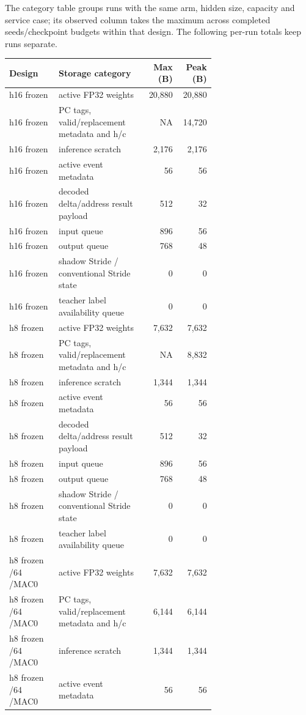 \documentclass[10pt]{article}
\begin{document}
The category table groups runs with the same arm, hidden size, capacity and service case; its observed column takes the maximum across completed seeds/checkpoint budgets within that design. The following per-run totals keep runs separate.

\begin{center}
\scriptsize
\begin{longtable}{p{0.24\linewidth}p{0.43\linewidth}rr}
\toprule
Design & Storage category & Max (B) & Peak (B) \\
\midrule
\endhead
h16 frozen & active FP32 weights & 20,880 & 20,880 \\
h16 frozen & PC tags, valid/replacement metadata and h/c & NA & 14,720 \\
h16 frozen & inference scratch & 2,176 & 2,176 \\
h16 frozen & active event metadata & 56 & 56 \\
h16 frozen & decoded delta/address result payload & 512 & 32 \\
h16 frozen & input queue & 896 & 56 \\
h16 frozen & output queue & 768 & 48 \\
h16 frozen & shadow Stride / conventional Stride state & 0 & 0 \\
h16 frozen & teacher label availability queue & 0 & 0 \\
h8 frozen & active FP32 weights & 7,632 & 7,632 \\
h8 frozen & PC tags, valid/replacement metadata and h/c & NA & 8,832 \\
h8 frozen & inference scratch & 1,344 & 1,344 \\
h8 frozen & active event metadata & 56 & 56 \\
h8 frozen & decoded delta/address result payload & 512 & 32 \\
h8 frozen & input queue & 896 & 56 \\
h8 frozen & output queue & 768 & 48 \\
h8 frozen & shadow Stride / conventional Stride state & 0 & 0 \\
h8 frozen & teacher label availability queue & 0 & 0 \\
h8 frozen /64 /MAC0 & active FP32 weights & 7,632 & 7,632 \\
h8 frozen /64 /MAC0 & PC tags, valid/replacement metadata and h/c & 6,144 & 6,144 \\
h8 frozen /64 /MAC0 & inference scratch & 1,344 & 1,344 \\
h8 frozen /64 /MAC0 & active event metadata & 56 & 56 \\

\end{longtable}
\end{center}
\end{document}
